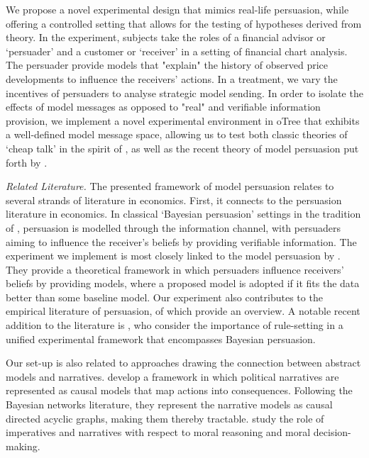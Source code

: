\documentclass[11pt, a4paper, leqno]{article}
\begin{document}
We propose a novel experimental design that mimics real-life persuasion, while offering a controlled setting that allows for the testing of hypotheses derived from theory. In the experiment, subjects take the roles of a financial advisor or `persuader' and a customer or `receiver' in a setting of financial chart analysis. The persuader provide models that "explain" the history of observed price developments to influence the receivers' actions. In a treatment, we vary the incentives of persuaders to analyse strategic model sending. In order to isolate the effects of model messages as opposed to "real" and verifiable information provision, we implement a novel experimental environment in oTree that exhibits a well-defined model message space, allowing us to test both classic theories of `cheap talk' in the spirit of \cite{crawford1982strategic}, as well as the recent theory of model persuasion put forth by \cite{Schwartzstein}.

\textit{Related Literature.} The presented framework of model persuasion relates to several strands of literature in economics. First, it connects to the persuasion literature in economics. In classical `Bayesian persuasion' settings in the tradition of \cite{KG}, persuasion is modelled through the information channel, with persuaders aiming to influence the receiver's beliefs by providing verifiable information. The experiment we implement is most closely linked to the model persuasion by \citet{Schwartzstein}. They provide a theoretical framework in which persuaders influence receivers' beliefs by providing models, where a proposed model is adopted if it fits the data better than some baseline model. Our experiment also contributes to the empirical literature of persuasion, of which \cite{dellavigna2010persuasion} provide an overview. A notable recent addition to the literature is \cite{frechette2019rules}, who consider the importance of rule-setting in a unified experimental framework that encompasses Bayesian persuasion.

Our set-up is also related to approaches drawing the connection between abstract models and narratives. \cite{Eliaz} develop a framework in which political narratives are represented as causal models that map actions into consequences. Following the Bayesian networks literature, they represent the narrative models as causal directed acyclic graphs, making them thereby tractable. \citet{Falk} study the role of imperatives and narratives with respect to moral reasoning and moral decision-making.
\end{document}
